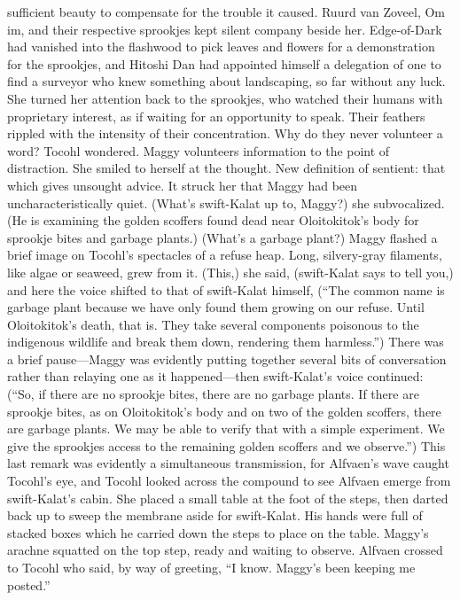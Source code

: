\documentclass[9pt]{article}
\begin{document}
sufficient beauty to compensate for the trouble it caused.
Ruurd van Zoveel, Om im, and their respective sprookjes kept silent company beside her.
Edge-of-Dark had vanished into the flashwood to pick leaves and flowers for a demonstration for the
sprookjes, and Hitoshi Dan had appointed himself a delegation of one to find a surveyor who knew
something about landscaping, so far without any luck.
She turned her attention back to the sprookjes, who watched their humans with proprietary interest,
as if waiting for an opportunity to speak. Their feathers rippled with the intensity of their concentration.
Why do they never volunteer a word? Tocohl wondered. Maggy volunteers information to the point
of distraction. She smiled to herself at the thought. New definition of sentient: that which gives unsought
advice.
It struck her that Maggy had been uncharacteristically quiet. (What’s swift-Kalat up to, Maggy?) she
subvocalized.
(He is examining the golden scoffers found dead near Oloitokitok’s body for sprookje bites and
garbage plants.)
(What’s a garbage plant?)
Maggy flashed a brief image on Tocohl’s spectacles of a refuse heap. Long, silvery-gray filaments,
like algae or seaweed, grew from it. (This,) she said, (swift-Kalat says to tell you,) and here the voice
shifted to that of swift-Kalat himself, (“The common name is garbage plant because we have only found
them growing on our refuse. Until Oloitokitok’s death, that is. They take several components poisonous
to the indigenous wildlife and break them down, rendering them harmless.”)
There was a brief pause—Maggy was evidently putting together several bits of conversation rather
than relaying one as it happened—then swift-Kalat’s voice continued: (“So, if there are no sprookje
bites, there are no garbage plants. If there are sprookje bites, as on Oloitokitok’s body and on two of
the golden scoffers, there are garbage plants. We may be able to verify that with a simple experiment.
We give the sprookjes access to the remaining golden scoffers and we observe.”)
This last remark was evidently a simultaneous transmission, for Alfvaen’s wave caught Tocohl’s eye,
and Tocohl looked across the compound to see Alfvaen emerge from swift-Kalat’s cabin. She placed a
small table at the foot of the steps, then darted back up to sweep the membrane aside for swift-Kalat.
His hands were full of stacked boxes which he carried down the steps to place on the table. Maggy’s
arachne squatted on the top step, ready and waiting to observe.
Alfvaen crossed to Tocohl who said, by way of greeting, “I know. Maggy’s been keeping me
posted.”
\end{document}
